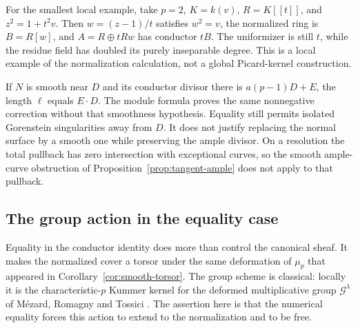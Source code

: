 For the smallest local example, take $p=2$, $K=k(v)$,
$R=K[[t]]$, and $z^2=1+t^2v$. Then $w=(z-1)/t$ satisfies $w^2=v$,
the normalized ring is $B=R[w]$, and $A=R\oplus tRw$ has conductor
$tB$. The uniformizer is still $t$, while the residue field has doubled
its purely inseparable degree. This is a local example of the
normalization calculation, not a global Picard-kernel construction.

If $N$ is smooth near $D$ and its conductor divisor there is
$a(p-1)D+E$, the length $\ell$ equals $E\cdot D$. The module formula
proves the same nonnegative correction without that smoothness
hypothesis. Equality still permits isolated Gorenstein singularities
away from $D$. It does not justify replacing the normal surface by a
smooth one while preserving the ample divisor. On a resolution the
total pullback has zero intersection with exceptional curves, so the
smooth ample-curve obstruction of Proposition~\ref{prop:tangent-ample}
does not apply to that pullback.

\subsection{The group action in the equality case}
Equality in the conductor identity does more than control the canonical
sheaf. It makes the normalized cover a torsor under the same deformation
of $\mu_p$ that appeared in Corollary~\ref{cor:smooth-torsor}.
The group scheme is classical: locally it is the characteristic-$p$
Kummer kernel for the deformed multiplicative group
$\mathcal G^\lambda$ of M\'ezard, Romagny and Tossici
\cite[\S2.2, p.~167, and Lemma~6.1, p.~188]{MRT}.
The assertion here is that the numerical equality forces this action
to extend to the normalization and to be free.

